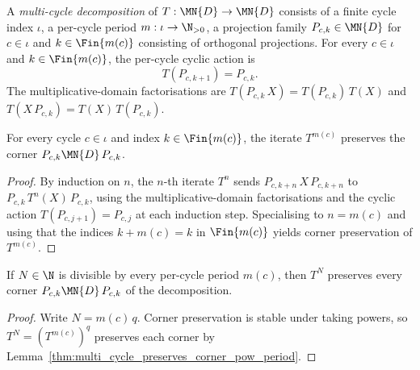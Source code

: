 \begin{definition}
    \label{def:multi_cycle_decomposition}
    \leanok
    A \emph{multi-cycle decomposition} of $T : \MN{D} \to \MN{D}$ consists of a
    finite cycle index $\iota$, a per-cycle period
    $m : \iota \to \N_{>0}$, a projection family
    $P_{c,k} \in \MN{D}$ for $c \in \iota$ and $k \in \Fin{m(c)}$
    consisting of orthogonal projections. For every $c \in \iota$ and
    $k \in \Fin{m(c)}$, the per-cycle cyclic action is
    \[
        T(P_{c,k+1}) = P_{c,k}.
    \]
    The multiplicative-domain factorisations are
    $T(P_{c,k}\,X) = T(P_{c,k})\,T(X)$ and
    $T(X\,P_{c,k}) = T(X)\,T(P_{c,k})$.
\end{definition}

\begin{lemma}
    \label{thm:multi_cycle_preserves_corner_pow_period}
    \leanok
    For every cycle $c \in \iota$ and index $k \in \Fin{m(c)}$, the
    iterate $T^{m(c)}$ preserves the corner $P_{c,k} \MN{D}\,P_{c,k}$.
\end{lemma}

\begin{proof}
    \leanok
    By induction on $n$, the $n$-th iterate $T^n$ sends
    $P_{c,k+n}\,X\,P_{c,k+n}$ to $P_{c,k}\,T^n(X)\,P_{c,k}$, using the
    multiplicative-domain factorisations and the cyclic action
    $T(P_{c,j+1}) = P_{c,j}$ at each induction step. Specialising to
    $n = m(c)$ and using that the indices $k + m(c) = k$ in $\Fin{m(c)}$
    yields corner preservation of $T^{m(c)}$.
\end{proof}

\begin{lemma}
    \label{thm:multi_cycle_preserves_corner_pow_of_dvd}
    \leanok
    If $N \in \N$ is divisible by every per-cycle period $m(c)$,
    then $T^N$ preserves every corner $P_{c,k} \MN{D}\,P_{c,k}$ of the
    decomposition.
\end{lemma}

\begin{proof}
    \leanok
    Write $N = m(c)\,q$. Corner preservation is stable under taking
    powers, so $T^N = (T^{m(c)})^q$ preserves each corner by
    Lemma~\ref{thm:multi_cycle_preserves_corner_pow_period}.
\end{proof}

